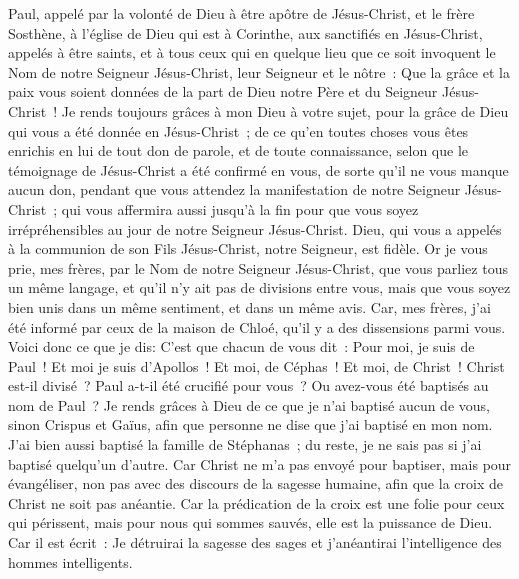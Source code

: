\begin{multicols}{2}
\VerseOne{}Paul, appelé par la volonté de Dieu à être apôtre de Jésus-Christ, et le frère Sosthène,
à l'église de Dieu qui est à Corinthe, aux sanctifiés en Jésus-Christ, appelés à être saints, et à tous ceux qui en quelque lieu que ce soit invoquent le Nom de notre Seigneur Jésus-Christ, leur Seigneur et le nôtre~:
Que la grâce et la paix vous soient données de la part de Dieu notre Père et du Seigneur Jésus-Christ~!
Je rends toujours grâces à mon Dieu à votre sujet, pour la grâce de Dieu qui vous a été donnée en Jésus-Christ~;
de ce qu'en toutes choses vous êtes enrichis en lui de tout don de parole, et de toute connaissance,
selon que le témoignage de Jésus-Christ a été confirmé en vous,
de sorte qu'il ne vous manque aucun don, pendant que vous attendez la manifestation de notre Seigneur Jésus-Christ~;
qui vous affermira aussi jusqu'à la fin pour que vous soyez irrépréhensibles au jour de notre Seigneur Jésus-Christ.
Dieu, qui vous a appelés à la communion de son Fils Jésus-Christ, notre Seigneur, est fidèle.
Or je vous prie, mes frères, par le Nom de notre Seigneur Jésus-Christ, que vous parliez tous un même langage, et qu'il n'y ait pas de divisions entre vous, mais que vous soyez bien unis dans un même sentiment, et dans un même avis.
Car, mes frères, j'ai été informé par ceux de la maison de Chloé, qu'il y a des dissensions parmi vous.
Voici donc ce que je dis: C'est que chacun de vous dit~: Pour moi, je suis de Paul~! Et moi je suis d'Apollos~! Et moi, de Céphas~! Et moi, de Christ~!
Christ est-il divisé~? Paul a-t-il été crucifié pour vous~? Ou avez-vous été baptisés au nom de Paul~?
Je rends grâces à Dieu de ce que je n'ai baptisé aucun de vous, sinon Crispus et Gaïus,
afin que personne ne dise que j'ai baptisé en mon nom.
J'ai bien aussi baptisé la famille de Stéphanas~; du reste, je ne sais pas si j'ai baptisé quelqu'un d'autre.
Car Christ ne m'a pas envoyé pour baptiser, mais pour évangéliser, non pas avec des discours de la sagesse humaine, afin que la croix de Christ ne soit pas anéantie.
Car la prédication de la croix est une folie pour ceux qui périssent, mais pour nous qui sommes sauvés, elle est la puissance de Dieu.
Car il est écrit~: Je détruirai la sagesse des sages et j'anéantirai l'intelligence des hommes intelligents.

\end{multicols}
